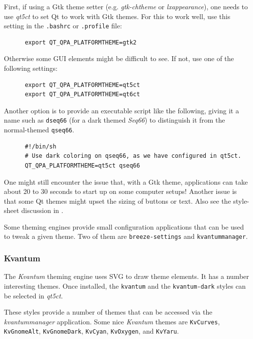   First, if using a Gtk theme setter (e.g. \textsl{gtk-chtheme}
   or \textsl{lxappearance}),
   one needs to
   use \textsl{qt5ct} to set Qt to work with Gtk themes.
   For this to work well, use this setting in the \texttt{.bashrc} or
   \texttt{.profile} file:

   \begin{verbatim}
      export QT_QPA_PLATFORMTHEME=gtk2
   \end{verbatim}

   Otherwise some GUI elements might be difficult to see.
   If not, use one of the following settings:

   \begin{verbatim}
      export QT_QPA_PLATFORMTHEME=qt5ct
      export QT_QPA_PLATFORMTHEME=qt6ct
   \end{verbatim}

   Another option is to provide an executable script like the following,
   giving it a name such as \texttt{dseq66}
   (for a dark themed \textsl{Seq66}) to
   distinguish it from the normal-themed \texttt{qseq66}.

   \begin{verbatim}
      #!/bin/sh
      # Use dark coloring on qseq66, as we have configured in qt5ct.
      QT_QPA_PLATFORMTHEME=qt5ct qseq66
   \end{verbatim}

   One might still encounter the issue that, with a Gtk theme, applications
   can take about 20 to 30 seconds to start up on some computer setups!
   Another issue is that some Qt themes might upset the sizing of buttons or
   text.
   Also see the style-sheet discussion in
   .

   Some theming engines provide small configuration applications that
   can be used to tweak a given theme.
   Two of them are
   \texttt{breeze-settings} and \texttt{kvantummanager}.

\subsubsection{Kvantum}
\label{subsubsec:palettes_theming_kvantum}

   The \textsl{Kvantum} theming engine uses SVG to draw theme elements.
   It has a number interesting themes. Once installed,
   the \texttt{kvantum} and
   the \texttt{kvantum-dark}
   styles can be selected in \textsl{qt5ct}.

   These styles provide a number of themes that can be
   accessed via the \textsl{kvantummanager} application.
   Some nice \textsl{Kvantum} themes are \texttt{KvCurves},
   \texttt{KvGnomeAlt},
   \texttt{KvGnomeDark},
   \texttt{KvCyan},
   \texttt{KvOxygen}, and
   \texttt{KvYaru}.

